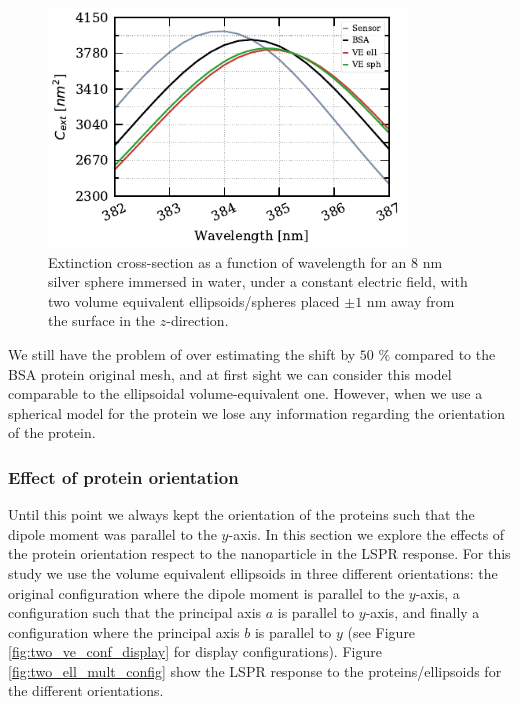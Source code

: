 \begin{figure} %
    \centering
    \includegraphics[width=0.85\textwidth]{two_ve_ell_sph_vs_BSA.pdf} 
    \caption{Extinction cross-section as a function of wavelength for an $8$ nm
    silver sphere immersed in water, under a constant electric field, with two volume equivalent 
    ellipsoids/spheres placed $\pm 1$ nm away from the surface in the $z$-direction.}
    \label{fig:sph_vs_ell_ve}
 \end{figure}

We still have the problem of over estimating the shift by $50$ $\%$ compared to the BSA protein original mesh, 
and at first sight we can consider this model comparable to the ellipsoidal volume-equivalent one. However, 
when we use a spherical model for the protein we lose any information regarding the orientation of the protein. 


 \subsubsection{Effect of protein orientation}

 Until this point we always kept the orientation of the proteins such that the dipole moment was parallel to the $y$-axis. In this 
 section we explore the effects of the protein orientation respect to the nanoparticle in the LSPR response. For this study we use the 
 volume equivalent ellipsoids in three different orientations: the original configuration where the dipole moment is parallel to 
 the $y$-axis, a configuration such that the principal axis $a$ is parallel to $y$-axis, 
 and finally a configuration where the principal axis $b$ is parallel to $y$ (see Figure \ref{fig:two_ve_conf_display} for display configurations). Figure \ref{fig:two_ell_mult_config}
 show the LSPR response to the proteins/ellipsoids for the different orientations. 
 
